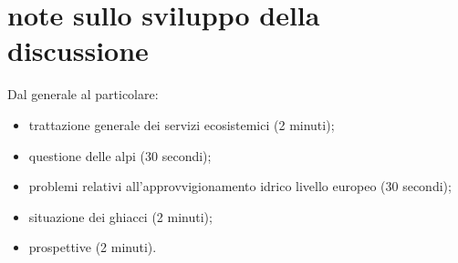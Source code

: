 \documentclass[11pt,a4paper]{article}
\begin{document}
	\newpage
	
	
	
	
	\appendix
	\section{note sullo sviluppo della discussione}
	Dal generale al particolare:
	\begin{itemize}
		\item trattazione generale dei servizi ecosistemici (2 minuti);
		\item questione delle alpi (30 secondi);
		\item problemi relativi all'approvvigionamento idrico livello europeo (30 secondi);
		\item situazione dei ghiacci (2 minuti);
		\item prospettive  (2 minuti).
	\end{itemize}
\end{document}
